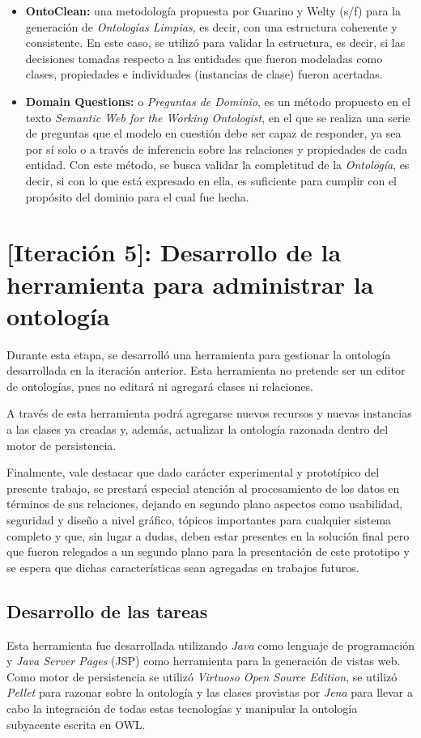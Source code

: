 \begin{itemize}
\begin{itemize}
    \item \textbf{OntoClean:} una metodología propuesta por Guarino y Welty (s/f) para la generación de \textit{Ontologías Limpias}, es decir, con una estructura coherente y consistente. En este caso, se utilizó para validar la estructura, es decir, si las decisiones tomadas respecto a las entidades que fueron modeladas como clases, propiedades e individuales (instancias de clase) fueron acertadas.
    \item \textbf{Domain Questions:} o \textit{Preguntas de Dominio}, es un método propuesto en el texto \textit{Semantic Web for the Working Ontologist}, en el que se realiza una serie de preguntas que el modelo en cuestión debe ser capaz de responder, ya sea por sí solo o a través de inferencia sobre las relaciones y propiedades de cada entidad. Con este método, se busca validar la completitud de la \textit{Ontología}, es decir, si con lo que está expresado en ella, es suficiente para cumplir con el propósito del dominio para el cual fue hecha.
\end{itemize}

\section{[Iteración 5]: Desarrollo de la herramienta para administrar la ontología}
Durante esta etapa, se desarrolló una herramienta para gestionar la ontología desarrollada en la iteración anterior. Esta herramienta no pretende ser un editor de ontologías, pues no editará ni agregará clases ni relaciones.

A través de esta herramienta podrá agregarse nuevos recursos y nuevas instancias a las clases ya creadas y, además, actualizar la ontología razonada dentro del motor de persistencia. 

Finalmente, vale destacar que dado carácter experimental y prototípico del presente trabajo, se prestará especial atención al procesamiento de los datos en términos de sus relaciones, dejando en segundo plano aspectos como usabilidad, seguridad y diseño a nivel gráfico, tópicos importantes para cualquier sistema completo y que, sin lugar a dudas, deben estar presentes en la solución final pero que fueron relegados a un segundo plano para la presentación de este prototipo y se espera que dichas características sean agregadas en trabajos futuros.

\subsection{Desarrollo de las tareas}
Esta herramienta fue desarrollada utilizando \textit{Java} como lenguaje de programación y \textit{Java Server Pages} (JSP) como herramienta para la generación de vistas web. Como motor de persistencia se utilizó \textit{Virtuoso Open Source Edition}, se utilizó \textit{Pellet} para razonar sobre la ontología y las clases provistas por \textit{Jena} para llevar a cabo la integración de todas estas tecnologías y manipular la ontología subyacente escrita en OWL.


\end{itemize}
